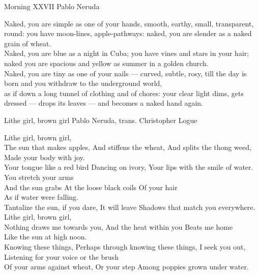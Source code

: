\begin{poem}
{Morning XXVII}
{Pablo Neruda}
 
 Naked, you are simple as one of your hands,
 smooth, earthy, small, transparent, round:
 you have moon-lines, apple-pathways:
 naked, you are slender as a naked grain of wheat.\\
 
 Naked, you are blue as a night in Cuba;
 you have vines and stars in your hair;
 naked you are spacious and yellow
 as summer in a golden church.\\
 
 Naked, you are tiny as one of your nails ---
 curved, subtle, rosy, till the day is born
 and you withdraw to the underground world,\\
 
 as if down a long tunnel of clothing and of chores:
 your clear light dims, gets dressed --- drops its leaves ---
 and becomes a naked hand again.
 \end{poem}

\begin{poem}
{Lithe girl, brown girl}
{Pablo Neruda, trans. Christopher Logue}

Lithe girl, brown girl,\\

The sun that makes apples,
And stiffens the wheat,
And splits the thong weed,\\
Made your body with joy.\\
Your tongue like a red bird
Dancing on ivory,
Your lips with the smile of water.\\
You stretch your arms\\
And the sun grabs
At the loose black coils
Of your hair\\
As if water were falling.\\
Tantalize the sun, if you dare,
It will leave
Shadows that match you everywhere.\\
Lithe girl, brown girl,\\
Nothing draws me towards you,
And the heat within you
Beats me home\\
Like the sun at high noon.\\
Knowing these things,
Perhaps through knowing these things,
I seek you out,
Listening for your voice or the brush\\
Of your arms against wheat,
Or your step
Among poppies grown under water.
\end{poem}


